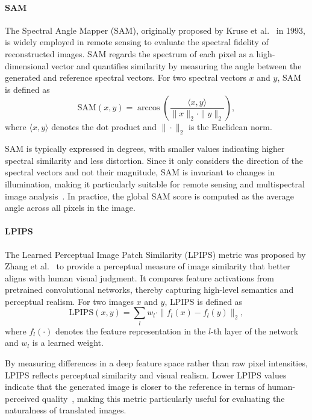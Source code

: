 \paragraph{SAM} 
The Spectral Angle Mapper (SAM), originally proposed by Kruse et al.~\cite{iqa_sam} in 1993, is widely employed in remote sensing to evaluate the spectral fidelity of reconstructed images. SAM regards the spectrum of each pixel as a high-dimensional vector and quantifies similarity by measuring the angle between the generated and reference spectral vectors. For two spectral vectors $x$ and $y$, SAM is defined as
\begin{equation}
\text{SAM}(x,y) = \arccos \left( \frac{\langle x, y \rangle}{\|x\|_2 \cdot \|y\|_2} \right),
\end{equation}
where $\langle x,y \rangle$ denotes the dot product and $\|\cdot\|_2$ is the Euclidean norm.  

SAM is typically expressed in degrees, with smaller values indicating higher spectral similarity and less distortion. Since it only considers the direction of the spectral vectors and not their magnitude, SAM is invariant to changes in illumination, making it particularly suitable for remote sensing and multispectral image analysis~\cite{S2MS_GAN}. In practice, the global SAM score is computed as the average angle across all pixels in the image.

\paragraph{LPIPS} 
The Learned Perceptual Image Patch Similarity (LPIPS) metric was proposed by Zhang et al.~\cite{iqa_lpips} to provide a perceptual measure of image similarity that better aligns with human visual judgment. It compares feature activations from pretrained convolutional networks, thereby capturing high-level semantics and perceptual realism. For two images $x$ and $y$, LPIPS is defined as
\begin{equation}
\text{LPIPS}(x,y) = \sum_{l} w_l \cdot \| f_l(x) - f_l(y) \|_2,
\end{equation}
where $f_l(\cdot)$ denotes the feature representation in the $l$-th layer of the network and $w_l$ is a learned weight.  

By measuring differences in a deep feature space rather than raw pixel intensities, LPIPS reflects perceptual similarity and visual realism. Lower LPIPS values indicate that the generated image is closer to the reference in terms of human-perceived quality~\cite{CR_Advances_Review_ORS,DiffCR}, making this metric particularly useful for evaluating the naturalness of translated images.

